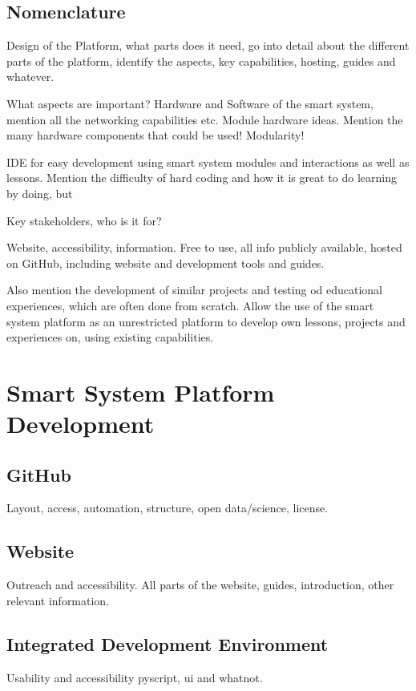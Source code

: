 \subsection{\label{sec:methods_nomenclature}Nomenclature}

Design of the Platform, what parts does it need, go into detail about the different parts of the platform, identify the aspects, key capabilities, hosting, guides and whatever. 

What aspects are important? Hardware and Software of the smart system, mention all the networking capabilities etc. Module hardware ideas. Mention the many hardware components that could be used! Modularity!

IDE for easy development using smart system modules and interactions as well as lessons. Mention the difficulty of hard coding and how it is great to do learning by doing, but 

Key stakeholders, who is it for?

Website, accessibility, information. Free to use, all info publicly available, hosted on GitHub, including website and development tools and guides.

Also mention the development of similar projects and testing od educational experiences, which are often done from scratch. Allow the use of the smart system platform as an unrestricted platform to develop own lessons, projects and experiences on, using existing capabilities. 

\section{\label{sec:methods_sspd}Smart System Platform Development}

\subsection{\label{sec:methods_gh}GitHub}
Layout, access, automation, structure, open data/science, license.

\subsection{\label{sec:methods_website}Website}
Outreach and accessibility.
All parts of the website, guides, introduction, other relevant information. 

\subsection{\label{sec:methods_ide}Integrated Development Environment}
Usability and accessibility
pyscript, ui and whatnot. 


